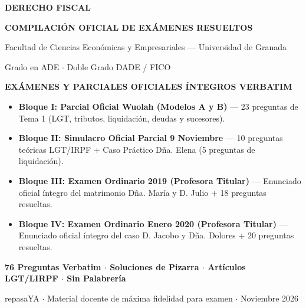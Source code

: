\documentclass[11pt,a4paper,openany]{article}
\begin{document}
\begin{titlepage}
    \centering
    \vspace*{1.2cm}
    
    {\Huge\textbf{\textsf{\color{fiscalPrimary}DERECHO FISCAL}}\par}
    \vspace{0.35cm}
    {\Large\textbf{\textsf{\color{fiscalAccent}COMPILACIÓN OFICIAL DE EXÁMENES RESUELTOS}}\par}
    \vspace{0.5cm}
    {\large\textsf{Facultad de Ciencias Económicas y Empresariales --- Universidad de Granada}\par}
    \vspace{0.25cm}
    {\normalsize\textsf{Grado en ADE $\cdot$ Doble Grado DADE / FICO}\par}
    
    \vspace{1.2cm}
    
    \begin{tcolorbox}[
        enhanced,
        colback=fiscalLight,
        colframe=fiscalPrimary,
        arc=4pt,
        boxrule=1.5pt,
        width=0.96\textwidth,
        halign=center
    ]
        \vspace{0.2cm}
        {\large\bfseries\color{fiscalDark}EXÁMENES Y PARCIALES OFICIALES ÍNTEGROS VERBATIM}\\[0.3cm]
        \normalsize
        \begin{itemize}[leftmargin=1.5cm,itemsep=3pt]
            \item \textbf{Bloque I: Parcial Oficial Wuolah (Modelos A y B)} --- 23 preguntas de Tema 1 (LGT, tributos, liquidación, deudas y sucesores).
            \item \textbf{Bloque II: Simulacro Oficial Parcial 9 Noviembre} --- 10 preguntas teóricas LGT/IRPF + Caso Práctico Dña. Elena (5 preguntas de liquidación).
            \item \textbf{Bloque III: Examen Ordinario 2019 (Profesora Titular)} --- Enunciado oficial íntegro del matrimonio Dña. María y D. Julio + 18 preguntas resueltas.
            \item \textbf{Bloque IV: Examen Ordinario Enero 2020 (Profesora Titular)} --- Enunciado oficial íntegro del caso D. Jacobo y Dña. Dolores + 20 preguntas resueltas.
        \end{itemize}
        \vspace{0.2cm}
        \textbf{\color{fiscalAccent}76 Preguntas Verbatim $\cdot$ Soluciones de Pizarra $\cdot$ Artículos LGT/LIRPF $\cdot$ Sin Palabrería}
        \vspace{0.2cm}
    \end{tcolorbox}
    
    \vfill
    {\footnotesize\textsf{\color{gray}repasaYA $\cdot$ Material docente de máxima fidelidad para examen $\cdot$ Noviembre 2026}\par}
\end{titlepage}
\end{document}

